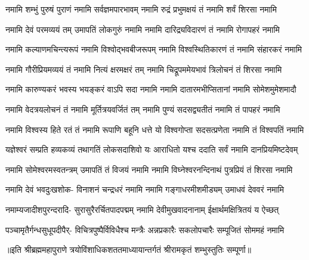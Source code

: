 
\fourlineindentedshloka
{नमामि शम्भुं पुरुषं पुराणं}
{नमामि सर्वज्ञमपारभावम्}
{नमामि रुद्रं प्रभुमक्षयं तं}
{नमामि शर्वं शिरसा नमामि}%

\fourlineindentedshloka
{नमामि देवं परमव्ययं तम्}
{उमापतिं लोकगुरुं नमामि}
{नमामि दारिद्र्यविदारणं तं}
{नमामि रोगापहरं नमामि}%

\fourlineindentedshloka
{नमामि कल्याणमचिन्त्यरूपं}
{नमामि विश्वोद्भवबीजरूपम्}
{नमामि विश्वस्थितिकारणं तं}
{नमामि संहारकरं नमामि}%

\fourlineindentedshloka
{नमामि गौरीप्रियमव्ययं तं}
{नमामि नित्यं क्षरमक्षरं तम्}
{नमामि चिद्रूपममेयभावं}
{त्रिलोचनं तं शिरसा नमामि}%

\fourlineindentedshloka
{नमामि कारुण्यकरं भवस्य}
{भयङ्करं वाऽपि सदा नमामि}
{नमामि दातारमभीप्सितानां}
{नमामि सोमेशमुमेशमादौ}%

\fourlineindentedshloka
{नमामि वेदत्रयलोचनं तं}
{नमामि मूर्तित्रयवर्जितं तम्}
{नमामि पुण्यं सदसद्व्यतीतं}
{नमामि तं पापहरं नमामि}%

\fourlineindentedshloka
{नमामि विश्वस्य हिते रतं तं}
{नमामि रूपाणि बहूनि धत्ते}
{यो विश्वगोप्ता सदसत्प्रणेता}
{नमामि तं विश्वपतिं नमामि}%

\fourlineindentedshloka
{यज्ञेश्वरं सम्प्रति हव्यकव्यं}
{तथागतिं लोकसदाशिवो यः}
{आराधितो यश्च ददाति सर्वं}
{नमामि दानप्रियमिष्टदेवम्}%

\fourlineindentedshloka
{नमामि सोमेश्वरमस्वतन्त्रम्}
{उमापतिं तं विजयं नमामि}
{नमामि विघ्नेश्वरनन्दिनाथं}
{पुत्रप्रियं तं शिरसा नमामि}%

\fourlineindentedshloka
{नमामि देवं भवदुःखशोक-}
{विनाशनं चन्द्रधरं नमामि}
{नमामि गङ्गाधरमीशमीड्यम्}
{उमाधवं देववरं नमामि}%

\fourlineindentedshloka
{नमाम्यजादीशपुरन्दरादि-}
{सुरासुरैरर्चितपादपद्मम्}
{नमामि देवीमुखवादनानाम्}
{ईक्षार्थमक्षित्रितयं य ऐच्छत्}%

\fourlineindentedshloka
{पञ्चामृतैर्गन्धसुधूपदीपैर्-}
{विचित्रपुष्पैर्विविधैश्च मन्त्रैः}
{अन्नप्रकारैः सकलोपचारैः}
{सम्पूजितं सोममहं नमामि}%

॥इति श्रीब्रह्ममहापुराणे त्रयोविंशाधिकशततमाध्यायान्तर्गतं श्रीरामकृतं शम्भुस्तुतिः सम्पूर्णा॥

